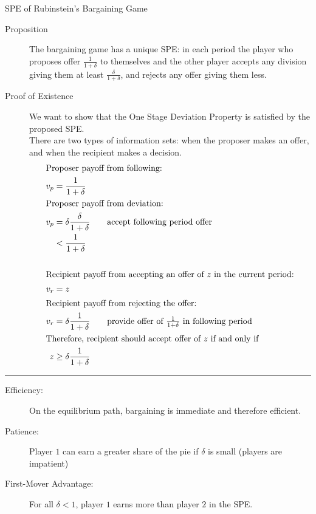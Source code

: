 \documentclass[10pt]{extarticle}
\begin{document}
  \begin{problem}{SPE of Rubinstein's Bargaining Game}
    \begin{description}
      \item[Proposition] The bargaining game has a unique SPE: in each period the player who proposes offer $\frac{1}{1+\delta}$ to themselves and the other player accepts any division giving them at least $\frac{\delta}{1 + \delta}$, and rejects any offer giving them less.
      \item[Proof of Existence] We want to show that the One Stage Deviation Property is satisfied by the proposed SPE.\\

        There are two types of information sets: when the proposer makes an offer, and when the recipient makes a decision.
        \begin{align*}
          \shortintertext{Proposer payoff from following:}
          v_{p} &= \frac{1}{1+\delta}\\
          \shortintertext{Proposer payoff from deviation:}
          v_{p} &= \delta\frac{\delta}{1+\delta} \tag*{accept following period offer}\\
                &< \frac{1}{1+\delta}\\
                \\
          \shortintertext{Recipient payoff from accepting an offer of $z$ in the current period:}
          v_{r} &= z\\
          \shortintertext{Recipient payoff from rejecting the offer:}
          v_{r} &= \delta\frac{1}{1+\delta} \tag*{provide offer of $\frac{1}{1+\delta}$ in following period}\\
          \shortintertext{Therefore, recipient should accept offer of $z$ if and only if}
          z &\geq \delta\frac{1}{1+\delta}
        \end{align*}
    \end{description}
    \vspace{4pt}
    \rule{\textwidth}{0.4pt}
    \vspace{4pt}
    \begin{description}
      \item[Efficiency:] On the equilibrium path, bargaining is immediate and therefore efficient.
      \item[Patience:] Player $1$ can earn a greater share of the pie if $\delta$ is small (players are impatient)
      \item[First-Mover Advantage:] For all $\delta < 1$, player $1$ earns more than player $2$ in the SPE.
    \end{description}
  \end{problem}
\end{document}
